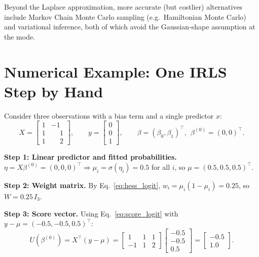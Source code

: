 \documentclass[a4paper,11pt]{article}
\begin{document}
Beyond the Laplace approximation, more accurate (but costlier) alternatives include Markov Chain Monte Carlo sampling (e.g.\ Hamiltonian Monte Carlo) and variational inference, both of which avoid the Gaussian-shape assumption at the mode.

\section{Numerical Example: One IRLS Step by Hand}
Consider three observations with a bias term and a single predictor $x$:
\begin{equation}
X = \begin{bmatrix} 1 & -1 \\ 1 & \phantom{-}1 \\ 1 & \phantom{-}2 \end{bmatrix}, \qquad
y = \begin{bmatrix} 0\\0\\1 \end{bmatrix}, \qquad \beta = (\beta_0,\beta_1)^\top,\ \ \beta^{(0)}=(0,0)^\top.
\end{equation}

\textbf{Step 1: Linear predictor and fitted probabilities.}
$\eta = X\beta^{(0)} = (0,0,0)^\top \Rightarrow \mu_i=\sigma(\eta_i)=0.5$ for all $i$, so $\mu=(0.5,0.5,0.5)^\top$.

\textbf{Step 2: Weight matrix.} By Eq.~\eqref{eq:hess_logit}, $w_i=\mu_i(1-\mu_i)=0.25$, so $W=0.25\,I_3$.

\textbf{Step 3: Score vector.} Using Eq.~\eqref{eq:score_logit} with $y-\mu=(-0.5,-0.5,0.5)^\top$:
\begin{equation}
U(\beta^{(0)}) = X^\top(y-\mu) =
\begin{bmatrix} 1 & 1 & 1 \\ -1 & 1 & 2 \end{bmatrix}
\begin{bmatrix} -0.5\\-0.5\\0.5 \end{bmatrix}
= \begin{bmatrix} -0.5 \\ 1.0 \end{bmatrix}.
\end{equation}
\end{document}
